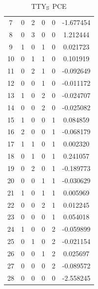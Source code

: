 \documentclass[preprint,12pt]{elsarticle}
\begin{document}
\begin{table}
\begin{minipage}[!h]{0.25\textwidth}
{\begin{tabular}{|c|cccc|c|}
7  &   0 &   2 &   0 &   0 &  -1.677454 \\
8  &   0 &   3 &   0 &   0 &   1.212444 \\
9  &   1 &   0 &   1 &   0 &   0.021723 \\
10 &   0 &   1 &   1 &   0 &   0.101919 \\
11 &   0 &   2 &   1 &   0 &  -0.092649 \\
12 &   0 &   0 &   1 &   0 &  -0.011172 \\
13 &   1 &   0 &   2 &   0 &  -0.024707 \\
14 &   0 &   0 &   2 &   0 &  -0.025082 \\
15 &   1 &   0 &   0 &   1 &   0.084859 \\
16 &   2 &   0 &   0 &   1 &  -0.068179 \\
17 &   1 &   1 &   0 &   1 &   0.002320 \\
18 &   0 &   1 &   0 &   1 &   0.241057 \\
19 &   0 &   2 &   0 &   1 &  -0.189773 \\
20 &   0 &   0 &   1 &   1 &  -0.030629 \\
21 &   1 &   0 &   1 &   1 &   0.005969 \\
22 &   0 &   0 &   2 &   1 &   0.012245 \\
23 &   0 &   0 &   0 &   1 &   0.054018 \\
24 &   1 &   0 &   0 &   2 &  -0.059899 \\
25 &   0 &   1 &   0 &   2 &  -0.021154 \\
26 &   0 &   0 &   1 &   2 &   0.025697 \\
27 &   0 &   0 &   0 &   2 &  -0.089572 \\
28 &   0 &   0 &   0 &   0 &  -2.558245 \\
\hline
\end{tabular}}
\caption{TTY$_{\mathbb{S}}$ PCE}
\end{minipage}%
\end{table}
\end{document}
